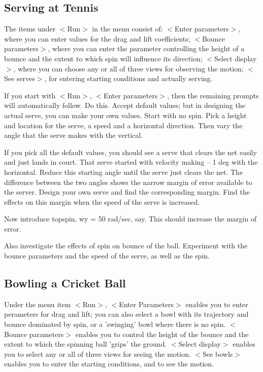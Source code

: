 \subsection{Serving at Tennis}

   The items under $<$Run$>$ in the menu consist of: $<$Enter parameters$>$,
where you can enter values for the drag and lift coefficients; $<$Bounce
parameters$>$, where you can enter the parameter controlling the height
of a bounce and the extent to which spin will influence its direction;
$<$Select display$>$, where you can choose any or all of three views for
observing the motion; $<$See serves$>$, for entering starting conditions
and actually serving.

   If you start with $<$Run$>$, $<$Enter parameters$>$, then the remaining
prompts will automatically follow. Do this. Accept default values;
but in designing the actual serve, you can make your own values.
Start with no spin. Pick a height and location for the serve, a speed
and a horizontal direction. Then vary the angle that the serve makes
with the vertical.

   If you pick all the default values, you should see a serve that
clears the net easily and just lands in court. That serve started
with velocity making -- 1 deg with the horizontal. Reduce this starting
angle until the serve just clears the net. The difference between the
two angles shows the narrow margin of error available to the server.
Design your own serve and find the corresponding margin. Find the
effects on this margin when the speed of the serve is increased.

   Now introduce topspin, wy = 50 rad/sec, say. This should increase
the margin of error.

   Also investigate the effects of spin on bounce of the ball.
Experiment with the bounce parameters and the speed of the serve, as well
as the spin.



\subsection{Bowling a Cricket Ball}

   Under the menu item $<$Run$>$, $<$Enter Parameters$>$ enables you to
enter perameters for drag and lift; you can also select a bowl
with its trajectory and bounce dominated by spin, or a 'swinging'
bowl where there is no spin. $<$Bounce parameters$>$ enables you to
control the height of the bounce and the extent to which the spinning
ball 'grips' the ground. $<$Select display$>$ enables you to select any
or all of three views for seeing the motion. $<$See bowls$>$ enables you
to enter the starting conditions, and to see the motion.

